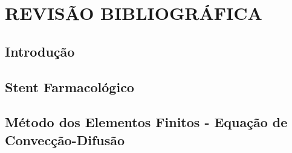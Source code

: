 \chapter{\textbf{REVISÃO BIBLIOGRÁFICA}}
\label{chap:chapname}

\section{\textbf{Introdução}} 


\section{\textbf{Stent Farmacológico}} 
\label{sec:secname}



\section{\textbf{Método dos Elementos Finitos - Equação de Convecção-Difusão}} 
\label{sec:secname}




